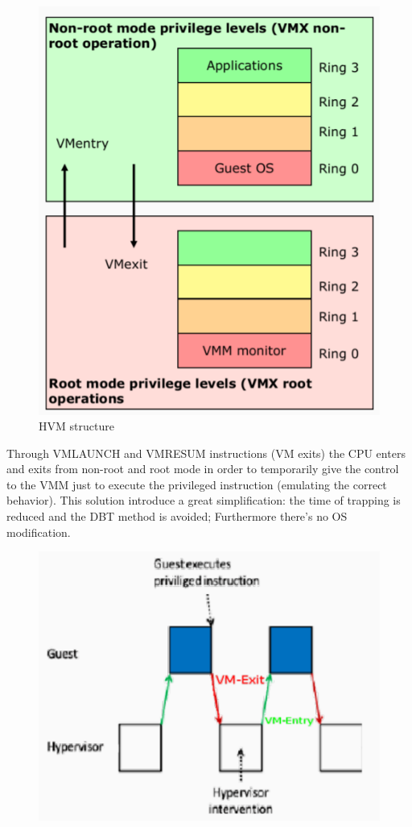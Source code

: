 \begin{itemize}
\begin{figure}[H]
        \includegraphics[scale=0.37]{images/HVM.png}
        \caption{HVM structure}
    \end{figure}
    Through VMLAUNCH and VMRESUM instructions (VM exits) the CPU enters and exits from non-root and root mode in order to temporarily give the control to the VMM just to execute the privileged instruction (emulating the correct behavior). This solution introduce a great simplification: the time of trapping is reduced and the DBT method is avoided; Furthermore there's no OS modification.
    \begin{figure}[H]
        \centering
        \includegraphics[scale=0.37]{images/VM exits.png}

\end{figure}
\end{itemize}
